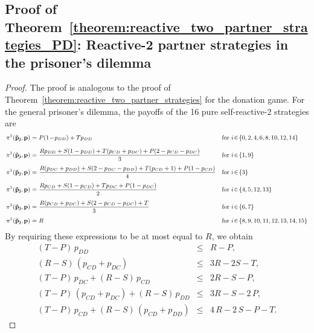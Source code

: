 \documentclass[9pt,twoside,lineno]{pnas-new}
\theoremstyle{plainCl1}
\theoremstyle{plainCl2}
\begin{document}

\subsection{Proof of Theorem~\ref{theorem:reactive_two_partner_strategies_PD}: Reactive-2 partner strategies in the prisoner's dilemma}

\begin{proof}
The proof is analogous to the proof of Theorem~\ref{theorem:reactive_two_partner_strategies} for the donation game. 
For the general prisoner's dilemma, the payoffs of the 16 pure self-reactive-2 strategies are
\begin{equation*} \small
\setlength{\arraycolsep}{0.5mm}
  \begin{array}{lcll} 
  \pi^1(\mathbf{\tilde p_j},\mathbf{p}) &= &\displaystyle  P (1 \!-\! p_{DD}) + T p_{DD} &~~\text{for}~ i\!\in\! \{0, 2, 4, 6, 8, 10, 12, 14\} \\ [0.35cm]
  \pi^1(\mathbf{\tilde p_j},\mathbf{p}) &= &\displaystyle \frac{Rp_{DD} + S(1-p_{DD}) + T(p_{CD} + p_{DC})+P(2-p_{CD} - p_{DC})}{3} &~~\text{for}~ i\!\in\!\{1, 9\} \\ [0.35cm]
\pi^1(\mathbf{\tilde p_j},\mathbf{p}) &= &\displaystyle \frac{R(p_{DC} + p_{DD}) + S(2-p_{DC} - p_{DD}) + T(p_{CD} + 1) + P(1 - p_{CD})}{4} &~~\text{for}~ i\!\in\! \{3\} \\ [0.35cm]
\pi^1(\mathbf{\tilde p_j},\mathbf{p}) &= &\displaystyle \frac{ Rp_{CD} + S(1-p_{CD}) + Tp_{DC}+P(1 - p_{DC})}{2} &~~\text{for}~ i\!\in\! \{4, 5, 12, 13\} \\ [0.35cm]
\pi^1(\mathbf{\tilde p_j},\mathbf{p}) &= &\displaystyle \frac{R(p_{CD} + p_{DC}) + S(2-p_{CD} - p_{DC}) + T}{3} &~~\text{for}~ i\!\in\! \{6, 7\} \\ [0.35cm]
\pi^1(\mathbf{\tilde p_j},\mathbf{p}) &= &\displaystyle R &~~\text{for}~ i\!\in\! \{8, 9, 10, 11, 12, 13, 14, 15\}
\end{array}
\end{equation*}
By requiring these expressions to be at most equal to $R$, we obtain
\begin{equation*}
  \begin{array}{rcl}
    (T - P)\, p_{DD} & \le & R - P, \\ [0.1cm]
    (R - S)\, (p_{CD} + p_{DC}) & \le & 3 R - 2 S - T, \\ [0.1cm]
    (T - P)\, p_{DC}  + (R - S)\, p_{CD} & \le & 2 R - S - P, \\ [0.1cm]
    (T - P)\, (p_{CD} + p_{DC}) + (R - S)\, p_{DD}  & \le & 3 R - S - 2\,P, \\ [0.1cm]
    (T - P)\, p_{CD}  + (R - S)\, (p_{CD} + p_{DD}) & \le & 4\,R - 2\,S - P - T.
\end{array}
\end{equation*}
\end{proof}
\end{document}
